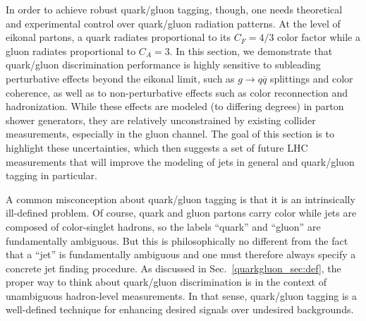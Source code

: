 \documentclass[11pt]{cernrep}
\begin{document}
In order to achieve robust quark/gluon tagging, though, one needs theoretical and experimental control over quark/gluon radiation patterns.  At the level of eikonal partons, a quark radiates proportional to its $C_F = 4/3$ color factor while a gluon radiates proportional to $C_A = 3$.  In this section, we demonstrate that quark/gluon discrimination performance is highly sensitive to subleading perturbative effects beyond the eikonal limit, such as $g \to q \overline{q}$ splittings and color coherence, as well as to non-perturbative effects such as color reconnection and hadronization.   While these effects are modeled (to differing degrees) in parton shower generators, they are relatively unconstrained by existing collider measurements, especially in the gluon channel.  The goal of this section is to highlight these uncertainties, which then suggests a set of future LHC measurements that will improve the modeling of jets in general and quark/gluon tagging in particular.

A common misconception about quark/gluon tagging is that it is an intrinsically ill-defined problem.  Of course, quark and gluon partons carry color while jets are composed of color-singlet hadrons, so the labels ``quark'' and ``gluon'' are fundamentally ambiguous.  But this is philosophically no different from the fact that a ``jet'' is fundamentally ambiguous and one must therefore always specify a concrete jet finding procedure.  As discussed in Sec.~\ref{quarkgluon_sec:def}, the proper way to think about quark/gluon discrimination is in the context of unambiguous hadron-level measurements.  In that sense, quark/gluon tagging is a well-defined technique for enhancing desired signals over undesired backgrounds.
\end{document}
